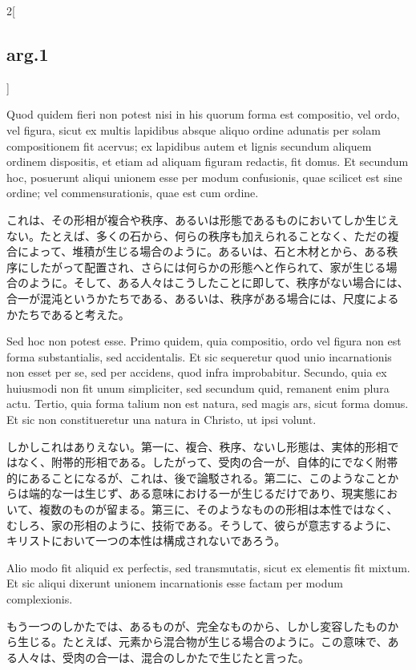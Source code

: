 \documentclass[paper=a4paper,fontsize=10pt,jafontsize=9pt,titlepage]{jlreq}
\begin{document}
\begin{paracol}{2}[\subsection{arg.1}]
\switchcolumn*

Quod quidem fieri non potest nisi in his quorum forma est compositio,
vel ordo, vel figura, sicut ex multis lapidibus absque aliquo ordine
adunatis per solam compositionem fit acervus; ex lapidibus autem et
lignis secundum aliquem ordinem dispositis, et etiam ad aliquam
figuram redactis, fit domus.  Et secundum hoc, posuerunt aliqui
unionem esse per modum confusionis, quae scilicet est sine ordine; vel
commensurationis, quae est cum ordine.

\switchcolumn

これは、その形相が複合や秩序、あるいは形態であるものにおいてしか生じえ
ない。たとえば、多くの石から、何らの秩序も加えられることなく、ただの複
合によって、堆積が生じる場合のように。あるいは、石と木材とから、ある秩
序にしたがって配置され、さらには何らかの形態へと作られて、家が生じる場
合のように。そして、ある人々はこうしたことに即して、秩序がない場合には、
合一が混沌というかたちである、あるいは、秩序がある場合には、尺度による
かたちであると考えた。

\switchcolumn*

Sed hoc non potest esse. Primo quidem, quia compositio, ordo vel
figura non est forma substantialis, sed accidentalis. Et sic
sequeretur quod unio incarnationis non esset per se, sed per accidens,
quod infra improbabitur. Secundo, quia ex huiusmodi non fit unum
simpliciter, sed secundum quid, remanent enim plura actu. Tertio, quia
forma talium non est natura, sed magis ars, sicut forma domus. Et sic
non constitueretur una natura in Christo, ut ipsi volunt.

\switchcolumn

しかしこれはありえない。第一に、複合、秩序、ないし形態は、実体的形相で
はなく、附帯的形相である。したがって、受肉の合一が、自体的にでなく附帯
的にあることになるが、これは、後で論駁される。第二に、このようなことか
らは端的な一は生じず、ある意味における一が生じるだけであり、現実態にお
いて、複数のものが留まる。第三に、そのようなものの形相は本性ではなく、
むしろ、家の形相のように、技術である。そうして、彼らが意志するように、
キリストにおいて一つの本性は構成されないであろう。

\switchcolumn*

Alio modo fit aliquid ex perfectis, sed transmutatis, sicut ex
elementis fit mixtum. Et sic aliqui dixerunt unionem incarnationis
esse factam per modum complexionis.

\switchcolumn

もう一つのしかたでは、あるものが、完全なものから、しかし変容したものか
ら生じる。たとえば、元素から混合物が生じる場合のように。この意味で、あ
る人々は、受肉の合一は、混合のしかたで生じたと言った。


\end{paracol}
\end{document}
